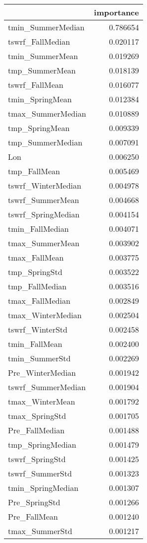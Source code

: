 \begin{tabular}{lr}
\toprule
 & importance \\
\midrule
tmin_SummerMedian & 0.786654 \\
tswrf_FallMedian & 0.020117 \\
tmin_SummerMean & 0.019269 \\
tmp_SummerMean & 0.018139 \\
tswrf_FallMean & 0.016077 \\
tmin_SpringMean & 0.012384 \\
tmax_SummerMedian & 0.010889 \\
tmp_SpringMean & 0.009339 \\
tmp_SummerMedian & 0.007091 \\
Lon & 0.006250 \\
tmp_FallMean & 0.005469 \\
tswrf_WinterMedian & 0.004978 \\
tswrf_SummerMean & 0.004668 \\
tswrf_SpringMedian & 0.004154 \\
tmin_FallMedian & 0.004071 \\
tmax_SummerMean & 0.003902 \\
tmax_FallMean & 0.003775 \\
tmp_SpringStd & 0.003522 \\
tmp_FallMedian & 0.003516 \\
tmax_FallMedian & 0.002849 \\
tmax_WinterMedian & 0.002504 \\
tswrf_WinterStd & 0.002458 \\
tmin_FallMean & 0.002400 \\
tmin_SummerStd & 0.002269 \\
Pre_WinterMedian & 0.001942 \\
tswrf_SummerMedian & 0.001904 \\
tmax_WinterMean & 0.001792 \\
tmax_SpringStd & 0.001705 \\
Pre_FallMedian & 0.001488 \\
tmp_SpringMedian & 0.001479 \\
tswrf_SpringStd & 0.001425 \\
tswrf_SummerStd & 0.001323 \\
tmin_SpringMedian & 0.001307 \\
Pre_SpringStd & 0.001266 \\
Pre_FallMean & 0.001240 \\
tmax_SummerStd & 0.001217 \\

\end{tabular}
